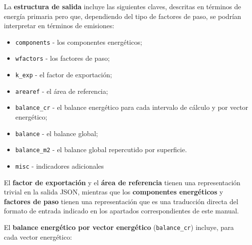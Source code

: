 \documentclass[10pt,notitlepage,oneside,a4paper]{article}
\begin{document}
La \textbf{estructura de salida} incluye las siguientes claves, descritas en términos de energía primaria pero que, dependiendo del tipo de factores de paso, se podrían interpretar en términos de emisiones:

\begin{itemize}
\item \texttt{components} - los componentes energéticos;
\item \texttt{wfactors} - los factores de paso;
\item \texttt{k\_exp} - el factor de exportación;
\item \texttt{arearef} - el área de referencia;
\item \texttt{balance\_cr} - el balance energético para cada intervalo de cálculo y por vector energético;
\item \texttt{balance} - el balance global;
\item \texttt{balance\_m2} - el balance global repercutido por superficie.
\item \texttt{misc} - indicadores adicionales
\end{itemize}

El \textbf{factor de exportación} y el \textbf{área de referencia} tienen una representación trivial en la salida JSON, mientras que los \textbf{componentes energéticos} y \textbf{factores de paso} tienen una representación que es una traducción directa del formato de entrada indicado en los apartados correspondientes de este manual.

El \textbf{balance energético por vector energético} (\texttt{balance\_cr}) incluye, para cada vector energético:
\end{document}
